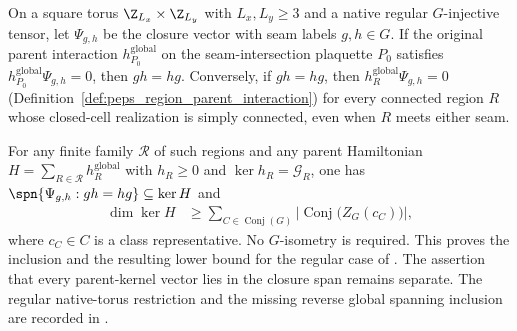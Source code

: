 \begin{lemma}%
    \label{thm:peps_regular_closure_parent_constraint}
    \leanok
    On a square torus $\Z_{L_x}\times\Z_{L_y}$ with $L_x,L_y\ge 3$ and a
    native regular $G$-injective tensor, let $\Psi_{g,h}$ be the closure
    vector with seam labels $g,h\in G$. If the original parent interaction
    $h_{P_0}^{\mathrm{global}}$ on the seam-intersection plaquette $P_0$
    satisfies $h_{P_0}^{\mathrm{global}}\Psi_{g,h}=0$, then $gh=hg$.
    Conversely, if $gh=hg$, then $h_R^{\mathrm{global}}\Psi_{g,h}=0$
    (Definition~\ref{def:peps_region_parent_interaction}) for every connected
    region $R$ whose closed-cell realization is simply connected, even when
    $R$ meets either seam.

    For any finite family $\mathcal R$ of such regions and any parent
    Hamiltonian $H=\sum_{R\in\mathcal R}h_R^{\mathrm{global}}$ with
    $h_R\ge 0$ and $\ker h_R=\mathcal G_R$, one has
    $\spn\{\Psi_{g,h}:gh=hg\}\subseteq\ker H$ and
    \begin{align}
        \dim\ker H & \ge
        \sum_{C\in\operatorname{Conj}(G)}
        \left|\operatorname{Conj}\bigl(Z_G(c_C)\bigr)\right|,
        \label{eq:peps_closure_parent_dim_bound}
    \end{align}
    where $c_C\in C$ is a class representative. No $G$-isometry is required.
    This proves the inclusion and the resulting lower bound for
    the regular case of \cite[Theorems~5.5 and~5.9]{Schuch2010PEPS}.
    The assertion that every parent-kernel vector lies in the
    closure span remains separate.
    The regular native-torus restriction and the missing reverse global spanning inclusion are recorded in
    \cite{gap:rmp_peps_quantum_double_g_isometry}.
\end{lemma}

